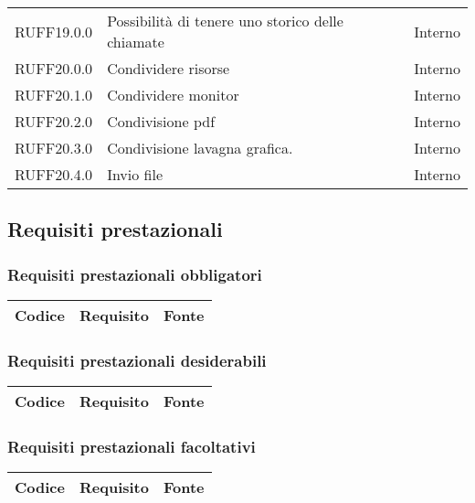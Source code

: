 \begin{center}
\begin{longtable}{lp{}l}
RUFF19.0.0 & Possibilità di tenere uno storico delle chiamate & Interno \\
RUFF20.0.0 & Condividere risorse & Interno \\
RUFF20.1.0 & Condividere monitor & Interno \\
RUFF20.2.0 & Condivisione pdf & Interno \\
RUFF20.3.0 & Condivisione lavagna grafica. & Interno \\
RUFF20.4.0 & Invio file & Interno \\
\bottomrule
\end{longtable}
\end{center}

\subsection{Requisiti prestazionali}

\subsubsection{Requisiti prestazionali obbligatori}

\begin{center}
\begin{longtable}{lp{}l}
\toprule Codice & Requisito & Fonte\\
\midrule
\bottomrule
\end{longtable}
\end{center}

\subsubsection{Requisiti prestazionali desiderabili}

\begin{center}
\begin{longtable}{lp{}l}
\toprule Codice & Requisito & Fonte\\
\midrule
\bottomrule
\end{longtable}
\end{center}

\subsubsection{Requisiti prestazionali facoltativi}

\begin{center}
\begin{longtable}{lp{}l}
\toprule Codice & Requisito & Fonte\\
\midrule
\bottomrule
\end{longtable}
\end{center}

